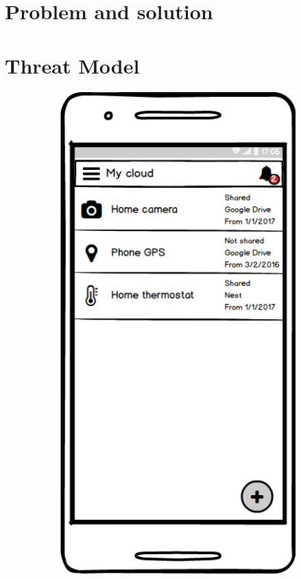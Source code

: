 \documentclass[conference]{IEEEtran}
\begin{document}
\section{Problem and solution}


\section{Threat Model}


\begin{figure}[t]

	\begin{subfigure}{0.24\textwidth}
	\includegraphics[width=0.95\linewidth]{screen1.png}

\end{subfigure}
\end{figure}
\end{document}
